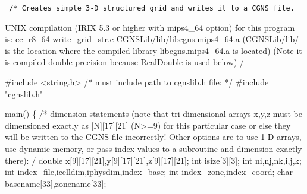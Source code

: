 \documentclass[12pt]{article}
\begin{document}
{\tt
\noindent /*
\newline Creates simple 3-D structured grid and writes it to a
\newline CGNS file.

\noindent UNIX compilation (IRIX 5.3 or higher with mips4\_64 option)
\newline for this program is:
\newline cc -r8 -64 write\_grid\_str.c CGNSLib/lib/libcgns.mips4\_64.a
\newline (CGNSLib/lib/ is the location where the compiled
\newline library libcgns.mips4\_64.a is located)
\newline (Note it is compiled double precision because RealDouble
\newline is used below)
\newline */

\noindent \#include <string.h>
\newline /* must include path to cgnslib.h file: */
\newline \#include "cgnslib.h"

\noindent main()
\newline \{
\newline /*
\newline\indent   dimension statements (note that tri-dimensional arrays
\newline\indent   x,y,z must be dimensioned exactly as [N][17][21] (N>=9)
\newline\indent   for this particular case or else they will be written to
\newline\indent   the CGNS file incorrectly!  Other options are to use 1-D
\newline\indent   arrays, use dynamic memory, or pass index values to a
\newline\indent   subroutine and dimension exactly there):
\newline */
\newline\indent   double x[9][17][21],y[9][17][21],z[9][17][21];
\newline\indent   int isize[3][3];
\newline\indent   int ni,nj,nk,i,j,k;
\newline\indent   int index\_file,icelldim,iphysdim,index\_base;
\newline\indent   int index\_zone,index\_coord;
\newline\indent   char basename[33],zonename[33];

}
\end{document}
